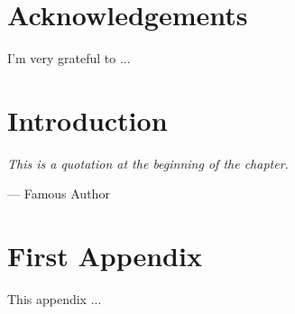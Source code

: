 \documentclass[12pt, a4paper, twoside]{book}
\let\oldepigraph\epigraph %
\renewcommand{\epigraph}[2]{\oldepigraph{\textit{#1}}{#2}} %
\begin{document}
\chapter*{Acknowledgements}

I'm very grateful to ...

\tableofcontents

\listoffigures
\listoftables

\mainmatter

\chapter{Introduction}
\epigraph{This is a quotation at the beginning of the chapter.}{--- Famous Author}


\printbibliography[heading=bibintoc, title={Bibliography}]

\appendix

%
\chapter{First Appendix}

This appendix ...

\backmatter
\end{document}
